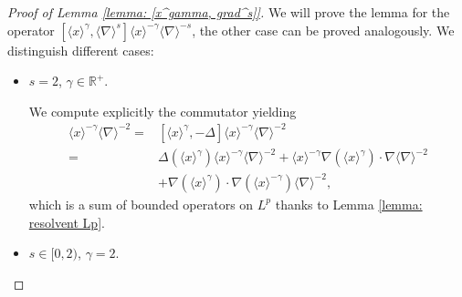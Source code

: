 \documentclass[10pt,a4paper]{amsart}
\newcommand{\R}{\mathbb{R}}
\begin{document}
\begin{proof}[Proof of Lemma \ref{lemma: [x^gamma, grad^s]}]
We will prove the lemma for the operator $[\langle x \rangle^\gamma , \langle \nabla \rangle^s]\langle x \rangle^{-\gamma} \langle \nabla \rangle^{-s} $, the other case can be proved analogously. 
We distinguish different cases: 
\begin{itemize}
    \item $s=2$, $\gamma \in \R^+$.

 We compute explicitly the commutator yielding
    \begin{align*}
        [\langle x \rangle^\gamma, \langle \nabla \rangle^2]\langle x \rangle^{-\gamma} \langle \nabla \rangle^{-2} =& [\langle x \rangle^\gamma, -\Delta]\langle x \rangle^{-\gamma} \langle \nabla \rangle^{-2}\\
        = &  \Delta (\langle x \rangle^\gamma) \langle x \rangle^{-\gamma} \langle \nabla \rangle^{-2} +  \langle x \rangle^{-\gamma} \nabla (\langle x \rangle^{\gamma})\cdot \nabla \langle \nabla \rangle^{-2} \\
        & + \nabla ( \langle x \rangle^{\gamma})\cdot \nabla ( \langle x \rangle^{-\gamma})  \langle \nabla \rangle^{-2}, 
    \end{align*}
    which is a sum of bounded operators on $L^p$ thanks to Lemma \ref{lemma: resolvent Lp}.
    
    \item $s \in [0,2)$,  $\gamma = 2$. 
    

\end{itemize}
\end{proof}
\end{document}
